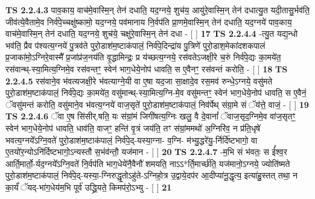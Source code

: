 \documentclass[17pt]{extarticle}
\begin{document}
                                \textbf{ TS 2.2.4.3} \newline
                  पाव॒काय॒ वाच॑मे॒वास्मि॒न् तेन॑ दधाति॒ यद॒ग्नये॒ शुच॑य॒ आयु॑रे॒वास्मि॒न् तेन॑ दधात्यु॒त यदी॒तासु॒र्भव॑ति॒ जीव॑त्ये॒वैतामे॒व निर्व॑पे॒च्चक्षु॑ष्कामो॒ यद॒ग्नये॒ पव॑मानाय नि॒र्वप॑ति प्रा॒णमे॒वास्मि॒न् तेन॑ दधाति॒ यद॒ग्नये॑ पाव॒काय॒ वाच॑मे॒वास्मि॒न् तेन॑ दधाति॒ यद॒ग्नये॒ शुच॑ये॒ चक्षु॑रे॒वास्मि॒न् तेन॑ दधा - [  ] \textbf{  17} \newline
                  \newline
                                \textbf{ TS 2.2.4.4} \newline
                  -त्यु॒त यद्य॒न्धो भव॑ति॒ प्रैव प॑श्यत्य॒ग्नये॑ पु॒त्रव॑ते पुरो॒डाश॑म॒ष्टाक॑पालं॒ निर्व॑पे॒दिन्द्रा॑य पु॒त्रिणे॑ पुरो॒डाश॒मेका॑दशकपालं प्र॒जाका॑मो॒ऽग्निरे॒वास्मै᳚ प्र॒जांप्र॑ज॒नय॑ति वृ॒द्धामिन्द्रः॒ प्र य॑च्छत्य॒ग्नये॒ रस॑वतेऽजक्षी॒रे च॒रुं निर्व॑पे॒द्यः का॒मये॑त॒ रस॑वान्थ्-स्या॒मित्य॒ग्निमे॒व रस॑वन्तꣳ॒॒ स्वेन॑ भाग॒धेये॒नोप॑ धावति॒ स ए॒वैनꣳ॒॒ रस॑वन्तं करोति॒ - [  ] \textbf{  18} \newline
                  \newline
                                \textbf{ TS 2.2.4.5} \newline
                  रस॑वाने॒व भ॑वत्यजक्षी॒रे भ॑वत्याग्ने॒यी वा ए॒षा यद॒जा सा॒क्षादे॒व रस॒मव॑ रुन्धे॒ऽग्नये॒ वसु॑मते पुरो॒डाश॑म॒ष्टाक॑पालं॒ निर्व॑पे॒द्यः का॒मये॑त॒ वसु॑मान्थ्-स्या॒मित्य॒ग्नि-मे॒व वसु॑मन्तꣳ॒॒ स्वेन॑ भाग॒धेये॒नोप॑ धावति॒ स ए॒वैनं॒ ॅवसु॑मन्तं करोति॒ वसु॑माने॒व भ॑वत्य॒ग्नये॑ वाज॒सृते॑ पुरो॒डाश॑म॒ष्टाक॑पालं॒ निव॑र्पेथ् संग्रा॒मे सं ॅय॑त्ते॒ वाजं॒ - [  ] \textbf{  19} \newline
                  \newline
                                \textbf{ TS 2.2.4.6} \newline
                  ॅवा ए॒ष सि॑सीर्.षति॒ यः स॑ग्रां॒मं जिगी॑षत्य॒ग्निः खलु॒ वै दे॒वानां᳚ ॅवाज॒सृद॒ग्निमे॒व वा॑ज॒सृतꣳ॒॒ स्वेन॑ भाग॒धेये॒नोप॑ धावति॒ धाव॑ति॒ वाजꣳ॒॒ हन्ति॑ वृ॒त्रं जय॑ति॒ तꣳ स॑ग्रां॒ममथो॑ अ॒ग्निरि॑व॒ न प्र॑ति॒धृषे॑ भवत्य॒ग्नये᳚ऽग्नि॒वते॑ पुरो॒डाश॑म॒ष्टाक॑पालं॒ निर्व॑पे॒द्-यस्या॒ग्ना- व॒ग्नि- म॑भ्यु॒द्धरे॑यु॒-र्निर्दि॑ष्टभागो॒ वा ए॒तयो॑र॒न्योऽनि॑र्दिष्टभागो॒ऽन्यस्तौ स॒भंव॑न्तौ॒ यज॑मान - [  ] \textbf{  20} \newline
                  \newline
                                \textbf{ TS 2.2.4.7} \newline
                  -म॒भि सं भ॑वतः॒ स ई᳚श्व॒र आर्ति॒मार्तो॒-र्यद॒ग्नये᳚ऽग्नि॒वते॑ नि॒र्वप॑ति भाग॒धेये॑नै॒वैनौ॑ शमयति॒ नाऽऽ*र्ति॒मार्च्छ॑ति॒ यज॑मानो॒ऽग्नये॒ ज्योति॑ष्मते पुरो॒डाश॑म॒ष्टाक॑पालं॒ निर्व॑पे॒द्-यस्या॒-ग्निरुद्धृ॒तोऽहु॑ते-ऽग्निहो॒त्र उ॒द्वाये॒दप॑र आ॒दीप्या॑नू॒द्धृत्य॒ इत्या॑हु॒स्तत् तथा॒ न का॒र्यं॑ ॅयद्-भा॑ग॒धेय॑म॒भि पूर्व॑ उद्ध्रि॒यते॒ किमप॑रो॒ऽभ्यु - [  ] \textbf{  21} \newline
\end{document}
